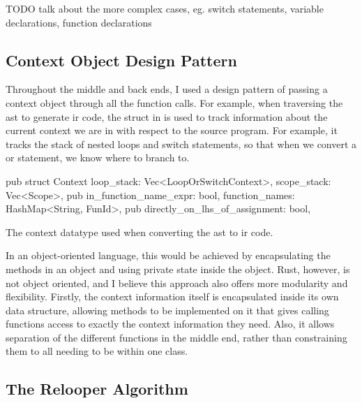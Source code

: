 \documentclass[00-main.tex]{subfiles}
\begin{document}
\begin{mrwComment}
TODO talk about the more complex cases, eg. switch statements, variable declarations, function declarations
\end{mrwComment}

\subsection{Context Object Design Pattern}

Throughout the middle and back ends, I used a design pattern of passing a context object through all the function calls.
For example, when traversing the \gls{ast} to generate \gls{ir} code, the  struct in  is used to track information about the current context we are in with respect to the source program.
For example, it tracks the stack of nested loops and switch statements, so that when we convert a  or  statement, we know where to branch to.

\begin{listing}[!ht]
  \begin{RustListing}
    pub struct Context {
        loop_stack: Vec<LoopOrSwitchContext>,
        scope_stack: Vec<Scope>,
        pub in_function_name_expr: bool,
        function_names: HashMap<String, FunId>,
        pub directly_on_lhs_of_assignment: bool,
    }
  \end{RustListing}
  \caption{The context datatype used when converting the \gls{ast} to \gls{ir} code.}
  \label{lst:AST to IR context struct}
\end{listing}

In an object-oriented language, this would be achieved by encapsulating the methods in an object and using private state inside the object.
Rust, however, is not object oriented, and I believe this approach also offers more modularity and flexibility.
Firstly, the context information itself is encapsulated inside its own data structure, allowing methods to be implemented on it that gives calling functions access to exactly the context information they need.
Also, it allows separation of the different functions in the middle end, rather than constraining them to all needing to be within one class.

\subsection{The Relooper Algorithm}
\end{document}
